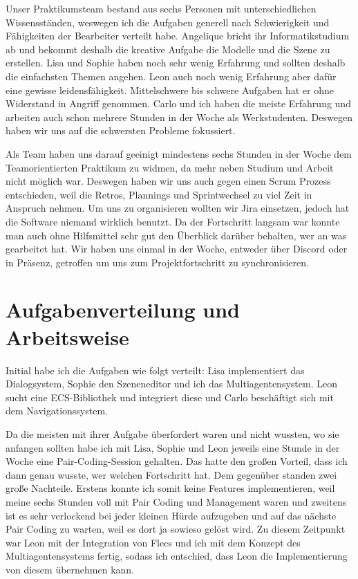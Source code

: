 Unser Praktikumsteam bestand aus sechs Personen mit unterschiedlichen Wissensständen, weswegen ich die Aufgaben generell nach Schwierigkeit und Fähigkeiten der Bearbeiter verteilt habe. Angelique bricht ihr Informatikstudium ab und bekommt deshalb die kreative Aufgabe die Modelle und die Szene zu erstellen. Lisa und Sophie haben noch sehr wenig Erfahrung und sollten deshalb die einfachsten Themen angehen. Leon auch noch wenig Erfahrung aber dafür eine gewisse leidensfähigkeit. Mittelschwere bis schwere Aufgaben hat er ohne Widerstand in Angriff genommen. Carlo und ich haben die meiste Erfahrung und arbeiten auch schon mehrere Stunden in der Woche als Werkstudenten. Deswegen haben wir uns auf die schwersten Probleme fokussiert.

Als Team haben uns darauf geeinigt mindestens sechs Stunden in der Woche dem Teamorientierten Praktikum zu widmen, da mehr neben Studium und Arbeit nicht möglich war. Deswegen haben wir uns auch gegen einen Scrum Prozess entschieden, weil die Retros, Plannings und Sprintwechsel zu viel Zeit in Anspruch nehmen. Um uns zu organisieren wollten wir Jira einsetzen, jedoch hat die Software niemand wirklich benutzt. Da der Fortschritt langsam war konnte man auch ohne Hilfsmittel sehr gut den Überblick darüber behalten, wer an was gearbeitet hat. Wir haben uns einmal in der Woche, entweder über Discord oder in Präsenz, getroffen um uns zum Projektfortschritt zu synchronisieren.

\section{Aufgabenverteilung und Arbeitsweise}

Initial habe ich die Aufgaben wie folgt verteilt: Lisa implementiert das Dialogsystem, Sophie den Szeneneditor und ich das Multiagentensystem. Leon sucht eine ECS-Bibliothek und integriert diese und Carlo beschäftigt sich mit dem Navigationssystem.

Da die meisten mit ihrer Aufgabe überfordert waren und nicht wussten, wo sie anfangen sollten habe ich mit Lisa, Sophie und Leon jeweils eine Stunde in der Woche eine Pair-Coding-Session gehalten. Das hatte den großen Vorteil, dass ich dann genau wusste, wer welchen Fortschritt hat. Dem gegenüber standen zwei große Nachteile. Erstens konnte ich somit keine Features implementieren, weil meine sechs Stunden voll mit Pair Coding und Management waren und zweitens ist es sehr verlockend bei jeder kleinen Hürde aufzugeben und auf das nächste Pair Coding zu warten, weil es dort ja sowieso gelöst wird.
Zu diesem Zeitpunkt war Leon mit der Integration von Flecs und ich mit dem Konzept des Multiagentensystems fertig, sodass ich entschied, dass Leon die Implementierung von diesem übernehmen kann.

